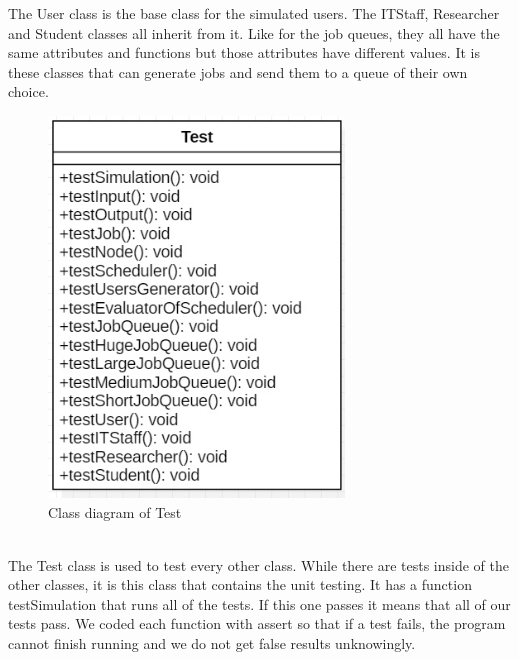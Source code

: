\documentclass [10 pt, a4 paper]{report}
\begin{document}
\noindent
The User class is the base class for the simulated users. The ITStaff, Researcher and Student classes all inherit from it. Like for the job queues, they all have the same attributes and functions but those attributes have different values. It is these classes that can generate jobs and send them to a queue of their own choice.

\clearpage

\begin{figure}[!htbp]
\centering
\includegraphics[width=0.7\textwidth]{Test.jpg}
\caption{\label{fig:image} Class diagram of Test}
\end{figure}
\\

\noindent
The Test class is used to test every other class. While there are tests inside of the other classes, it is this class that contains the unit testing. It has a function testSimulation that runs all of the tests. If this one passes it means that all of our tests pass. We coded each function with assert so that if a test fails, the program cannot finish running and we do not get false results unknowingly.

\clearpage
\end{document}
